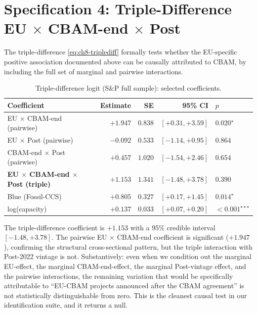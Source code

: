 \documentclass[11pt,a4paper]{article}
\begin{document}
\section{Specification 4: Triple-Difference EU $\times$ CBAM-end $\times$ Post}
\label{sec:ch8-triplediff}

The triple-difference \eqref{eq:ch8-triplediff} formally tests whether the EU-specific positive association documented above can be causally attributed to CBAM, by including the full set of marginal and pairwise interactions.

\begin{table}[ht]
\centering
\caption{Triple-difference logit (S\&P full sample): selected coefficients.}
\label{tab:ch8-triplediff}
\begin{tabular}{lrrrl}
\toprule
Coefficient & Estimate & SE & 95\% CI & $p$ \\
\midrule
EU $\times$ CBAM-end (pairwise)         & $+1.947$ & $0.838$ & $[+0.31, +3.59]$ & $0.020^{\star}$ \\
EU $\times$ Post (pairwise)              & $-0.092$ & $0.533$ & $[-1.14, +0.95]$ & $0.864$ \\
CBAM-end $\times$ Post (pairwise)        & $+0.457$ & $1.020$ & $[-1.54, +2.46]$ & $0.654$ \\
\rowcolor{yellow!15}
\textbf{EU $\times$ CBAM-end $\times$ Post (triple)} & $\mathbf{+1.153}$ & $\mathbf{1.341}$ & $\mathbf{[-1.48, +3.78]}$ & $\mathbf{0.390}$ \\
\midrule
Blue (Fossil-CCS)                        & $+0.805$ & $0.327$ & $[+0.17, +1.45]$ & $0.014^{\star}$ \\
log(capacity)                            & $+0.137$ & $0.033$ & $[+0.07, +0.20]$ & $<0.001^{\star\star\star}$ \\
\bottomrule
\end{tabular}
\end{table}

The triple-difference coefficient is $+1.153$ with a 95\% credible interval $[-1.48, +3.78]$. The pairwise EU $\times$ CBAM-end coefficient is significant ($+1.947$), confirming the structural cross-sectional pattern, but the triple interaction with Post-2022 vintage is not. Substantively: even when we condition out the marginal EU-effect, the marginal CBAM-end-effect, the marginal Post-vintage effect, and the pairwise interactions, the remaining variation that would be specifically attributable to ``EU-CBAM projects announced after the CBAM agreement'' is not statistically distinguishable from zero. This is the cleanest causal test in our identification suite, and it returns a null.
\end{document}
